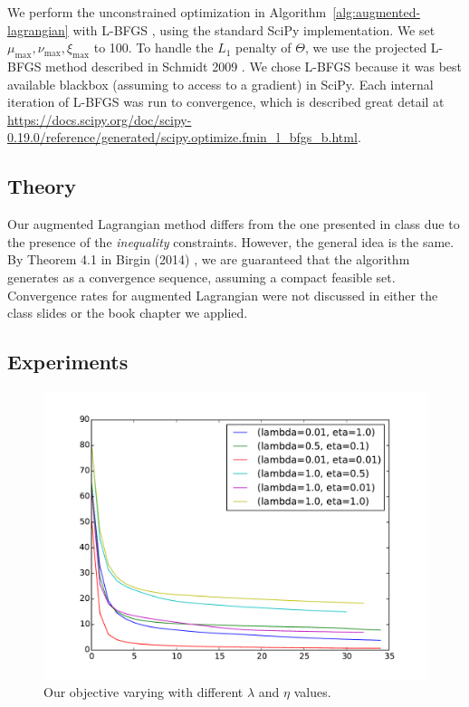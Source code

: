 \documentclass{article}
\newcommand{\0}{\mathrm{0}}
\newcommand{\1}{\mathrm{1}}
\begin{document}
We perform the unconstrained optimization in
Algorithm~\ref{alg:augmented-lagrangian} with L-BFGS
\cite{liu1989limited}, using the standard SciPy implementation. We set $\mu_\text{max}, \nu_\text{max}, \xi_\text{max}$ to 100. To
handle the $L_1$ penalty of $\Theta$, we use the projected L-BFGS
method described in Schmidt 2009 \cite{schmidt2009optimization}.  We chose
L-BFGS because it was best available blackbox (assuming to access to a
gradient) in SciPy. Each internal iteration of L-BFGS was run to convergence,
which is described great detail at \url{https://docs.scipy.org/doc/scipy-0.19.0/reference/generated/scipy.optimize.fmin_l_bfgs_b.html}.

\subsection{Theory}
Our augmented Lagrangian method differs from the one presented in
class due to the presence of the {\em inequality}
constraints. However, the general idea is the same. By Theorem 4.1 in
Birgin (2014) \cite{birgin2014practical}, we are guaranteed that the algorithm
generates as a convergence sequence, assuming a compact
feasible set. Convergence rates for augmented Lagrangian were not discussed in either the class slides
or the book chapter we applied.


\subsection{Experiments}

\begin{figure}
  \includegraphics[width=\textwidth]{augmented-lagrangian/plots/objective.pdf}
  \caption{Our objective varying with different $\lambda$ and $\eta$ values.}
\end{figure}
\end{document}
